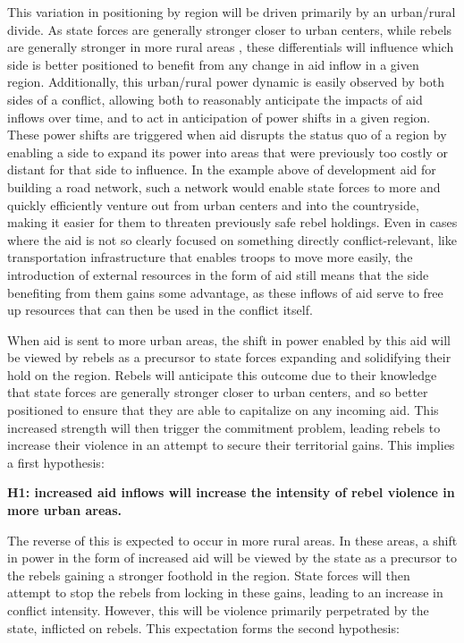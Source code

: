 \documentclass[12pt, letterpaper]{article}
\renewcommand{\cite}{\citep}
\begin{document}
This variation in positioning by region will be driven primarily by an urban/rural divide. As state forces are generally stronger closer to urban centers, while rebels are generally stronger in more rural areas \cite{kalyvas2006logic}, these differentials will influence which side is better positioned to benefit from any change in aid inflow in a given region. Additionally, this urban/rural power dynamic is easily observed by both sides of a conflict, allowing both to reasonably anticipate the impacts of aid inflows over time, and to act in anticipation of power shifts in a given region. These power shifts are triggered when aid disrupts the status quo of a region by enabling a side to expand its power into areas that were previously too costly or distant for that side to influence. In the example above of development aid for building a road network, such a network would enable state forces to more and quickly efficiently venture out from urban centers and into the countryside, making it easier for them to threaten previously safe rebel holdings. Even in cases where the aid is not so clearly focused on something directly conflict-relevant, like transportation infrastructure that enables troops to move more easily, the introduction of external resources in the form of aid still means that the side benefiting from them gains some advantage, as these inflows of aid serve to free up resources that can then be used in the conflict itself.

When aid is sent to more urban areas, the shift in power enabled by this aid will be viewed by rebels as a precursor to state forces expanding and solidifying their hold on the region. Rebels will anticipate this outcome due to their knowledge that state forces are generally stronger closer to urban centers, and so better positioned to ensure that they are able to capitalize on any incoming aid. This increased strength will then trigger the commitment problem, leading rebels to increase their violence in an attempt to secure their territorial gains. This implies a first hypothesis:

	\textbf{H1: increased aid inflows will increase the intensity of rebel violence in more urban areas.}
	
The reverse of this is expected to occur in more rural areas. In these areas, a shift in power in the form of increased aid will be viewed by the state as a precursor to the rebels gaining a stronger foothold in the region. State forces will then attempt to stop the rebels from locking in these gains, leading to an increase in conflict intensity. However, this will be violence primarily perpetrated by the state, inflicted on rebels. This expectation forms the second hypothesis:
	
\end{document}
